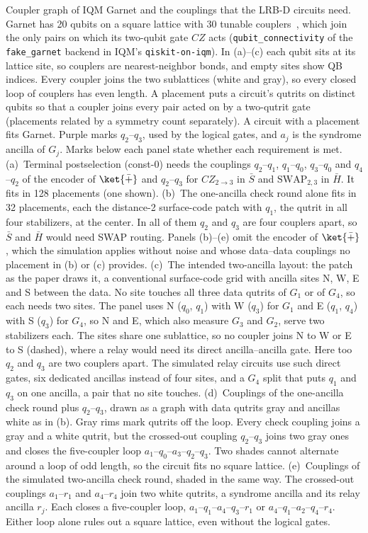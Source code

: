 Coupler graph of IQM Garnet and the couplings that the LRB-D circuits need. Garnet has 20 qubits on a square lattice with 30 tunable couplers~\cite{IQM240812433}, which join the only pairs on which its two-qubit gate $CZ$ acts (\texttt{qubit\_connectivity} of the \texttt{fake\_garnet} backend in IQM's \texttt{qiskit-on-iqm}). In (a)--(c) each qubit sits at its lattice site, so couplers are nearest-neighbor bonds, and empty sites show QB indices. Every coupler joins the two sublattices (white and gray), so every closed loop of couplers has even length. A placement puts a circuit's qutrits on distinct qubits so that a coupler joins every pair acted on by a two-qutrit gate (placements related by a symmetry count separately). A circuit with a placement fits Garnet. Purple marks $q_2$--$q_3$, used by the logical gates, and $a_j$ is the syndrome ancilla of $G_j$. Marks below each panel state whether each requirement is met.
(a)~Terminal postselection (const-0) needs the couplings $q_2$--$q_1$, $q_1$--$q_0$, $q_3$--$q_0$ and $q_4$--$q_2$ of the encoder of $\ket{\bar +}$ and $q_2$--$q_3$ for $CZ_{2\to 3}$ in $\bar S$ and $\mathrm{SWAP}_{2,3}$ in $\bar H$. It fits in 128 placements (one shown).
(b)~The one-ancilla check round alone fits in 32 placements, each the distance-2 surface-code patch with $q_1$, the qutrit in all four stabilizers, at the center. In all of them $q_2$ and $q_3$ are four couplers apart, so $\bar S$ and $\bar H$ would need SWAP routing. Panels (b)--(e) omit the encoder of $\ket{\bar +}$, which the simulation applies without noise and whose data--data couplings no placement in (b) or (c) provides.
(c)~The intended two-ancilla layout: the patch as the paper draws it, a conventional surface-code grid with ancilla sites N, W, E and S between the data. No site touches all three data qutrits of $G_1$ or of $G_4$, so each needs two sites. The panel uses N ($q_0$, $q_1$) with W ($q_3$) for $G_1$ and E ($q_1$, $q_4$) with S ($q_3$) for $G_4$, so N and E, which also measure $G_3$ and $G_2$, serve two stabilizers each. The sites share one sublattice, so no coupler joins N to W or E to S (dashed), where a relay would need its direct ancilla--ancilla gate. Here too $q_2$ and $q_3$ are two couplers apart. The simulated relay circuits use such direct gates, six dedicated ancillas instead of four sites, and a $G_4$ split that puts $q_1$ and $q_3$ on one ancilla, a pair that no site touches.
(d)~Couplings of the one-ancilla check round plus $q_2$--$q_3$, drawn as a graph with data qutrits gray and ancillas white as in (b). Gray rims mark qutrits off the loop. Every check coupling joins a gray and a white qutrit, but the crossed-out coupling $q_2$--$q_3$ joins two gray ones and closes the five-coupler loop $a_1$--$q_0$--$a_3$--$q_2$--$q_3$. Two shades cannot alternate around a loop of odd length, so the circuit fits no square lattice.
(e)~Couplings of the simulated two-ancilla check round, shaded in the same way. The crossed-out couplings $a_1$--$r_1$ and $a_4$--$r_4$ join two white qutrits, a syndrome ancilla and its relay ancilla $r_j$. Each closes a five-coupler loop, $a_1$--$q_1$--$a_4$--$q_3$--$r_1$ or $a_4$--$q_1$--$a_2$--$q_4$--$r_4$. Either loop alone rules out a square lattice, even without the logical gates.
